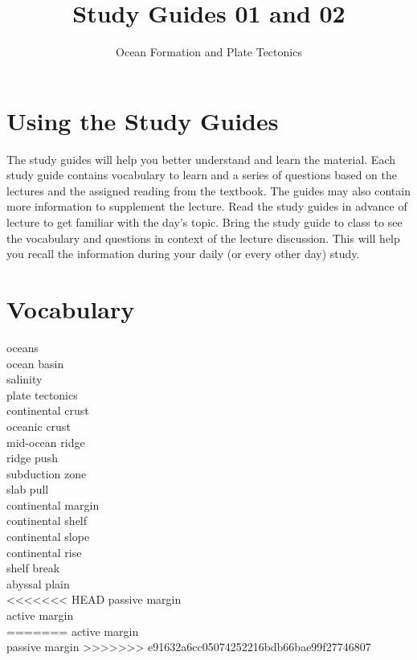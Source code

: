 \documentclass[nofonts, letterpaper]{tufte-handout}
\title{Study Guides 01 and 02}%
\author{Ocean Formation and Plate Tectonics}
\date{} %
\begin{document}
\maketitle	%


\section{Using the Study Guides}
The study guides will help you better understand and learn the material.  Each study guide contains vocabulary to learn and a series of questions based on the lectures and the assigned reading from the textbook.  The guides may also contain more information to supplement the lecture.  Read the study guides in advance of lecture to get familiar with the day's topic. Bring the study guide to class to see the vocabulary and questions in context of the lecture discussion.  This will help you recall the information during your daily (or every other day) study.

\section{Vocabulary}
\vspace{-1\baselineskip}
\begin{multicols}{2}
oceans\\
ocean basin\\
salinity \\
plate tectonics\\
continental crust\\
oceanic crust\\
mid-ocean ridge\\
ridge push\\
subduction zone\\
slab pull\\
continental margin\\
continental shelf\\
continental slope\\
continental rise\\
shelf break\\
abyssal plain\\
<<<<<<< HEAD
passive margin\\
active margin\\
=======
active margin\\
passive margin
>>>>>>> e91632a6cc05074252216bdb66bae99f27746807
\end{multicols}
\end{document}
